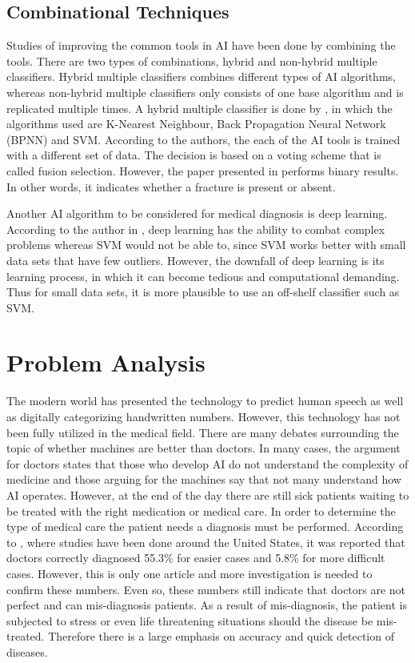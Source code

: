 \documentclass[11pt,twocolumn]{witseiepaper}
\begin{document}
	\subsection{Combinational Techniques}
	Studies of improving the common tools in AI have been done by combining the tools. There are two types of combinations, hybrid and non-hybrid multiple classifiers. Hybrid multiple classifiers combines different types of AI algorithms, whereas non-hybrid multiple classifiers only consists of one base algorithm and is replicated multiple times. A hybrid multiple classifier is done by \cite{multiple_classification}, in which the algorithms used are K-Nearest Neighbour, Back Propagation Neural Network (BPNN) and SVM. According to the authors, the each of the AI tools is trained with a different set of data. The decision is based on a voting scheme that is called fusion selection. However, the paper presented in \cite{multiple_classification} performs binary results. In other words, it indicates whether a fracture is present or absent. 
	
	Another AI algorithm to be considered for medical diagnosis is deep learning. According to the author in \cite{LeCun2015}, deep learning has the ability to combat complex problems whereas SVM would not be able to, since SVM works better with small data sets that have few outliers. However, the downfall of deep learning is its learning process, in which it can become tedious and computational demanding. Thus for small data sets, it is more plausible to use an off-shelf classifier such as SVM.
	
	\section{Problem Analysis}
	The modern world has presented the technology to predict human speech as well as digitally categorizing handwritten numbers. However, this technology has not been fully utilized in the medical field. There are many debates surrounding the topic of whether machines are better than doctors. In many cases, the argument for doctors states that those who develop AI do not understand the complexity of medicine and those arguing for the machines say that not many understand how AI operates. However, at the end of the day there are still sick patients waiting to be treated with the right medication or medical care. In order to determine the type of medical care the patient needs a diagnosis must be performed. According to \cite{meyer_physicians_2013}, where studies have been done around the United States, it was reported that doctors correctly diagnosed 55.3\% for easier cases and 5.8\% for more difficult cases. However, this is only one article and more investigation is needed to confirm these numbers. Even so, these numbers still indicate that doctors are not perfect and can mis-diagnosis patients. As a result of mis-diagnosis, the patient is subjected to stress or even life threatening situations should the disease be mis-treated. Therefore there is a large emphasis on accuracy and quick detection of diseases.
	
\end{document}
